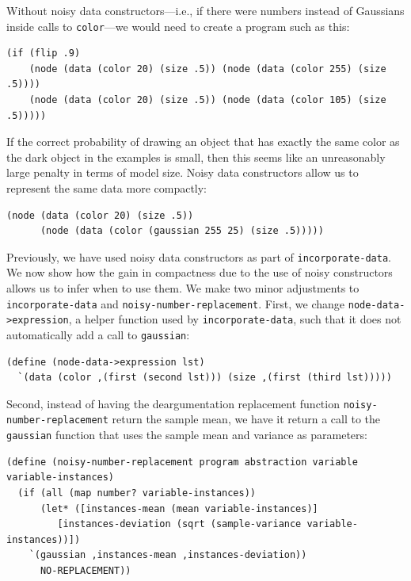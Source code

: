 \documentclass[a4paper,10pt]{article}
\begin{document}
Without noisy data constructors---i.e., if there were numbers instead of Gaussians inside calls to \texttt{color}---we would need to create a program such as this:
\begin{lstlisting}
(if (flip .9)
    (node (data (color 20) (size .5)) (node (data (color 255) (size .5))))
    (node (data (color 20) (size .5)) (node (data (color 105) (size .5)))))
\end{lstlisting}
If the correct probability of drawing an object that has exactly the same color as the dark object in the examples is small, then this seems like an unreasonably large penalty in terms of model size. Noisy data constructors allow us to represent the same data more compactly:
\begin{lstlisting}
(node (data (color 20) (size .5))
      (node (data (color (gaussian 255 25) (size .5)))))
\end{lstlisting}
Previously, we have used noisy data constructors as part of \texttt{incorporate-data}. We now show how the gain in compactness due to the use of noisy constructors allows us to infer when to use them. We make two minor adjustments to \texttt{incorporate-data} and \texttt{noisy-number-replacement}. First, we change \texttt{node-data->expression}, a helper function used by \texttt{incorporate-data}, such that it does not automatically add a call to \texttt{gaussian}:
\begin{lstlisting}[frame=trblsingle]
(define (node-data->expression lst)
  `(data (color ,(first (second lst))) (size ,(first (third lst)))))
\end{lstlisting}
Second, instead of having the deargumentation replacement function \texttt{noisy-number-replacement} return the sample mean, we have it return a call to the \texttt{gaussian} function that uses the sample mean and variance as parameters:
\begin{lstlisting}[frame=trblsingle]
(define (noisy-number-replacement program abstraction variable variable-instances)
  (if (all (map number? variable-instances))
      (let* ([instances-mean (mean variable-instances)]
	     [instances-deviation (sqrt (sample-variance variable-instances))])
	`(gaussian ,instances-mean ,instances-deviation))
      NO-REPLACEMENT))
\end{lstlisting}
\end{document}
